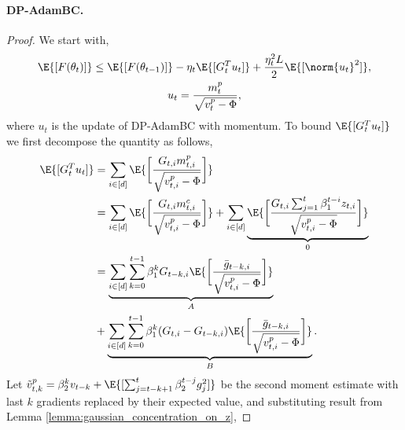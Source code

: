 \documentclass[letterpaper]{article} %
\begin{document}
\paragraph{DP-AdamBC.}
\begin{proof}
    We start with,
    \begin{gather*}
        \E{[F(\theta_t)]} \leq \E{[F(\theta_{t-1})]} - \eta_t \E{[G_t^T u_t]} + \frac{\eta_t^2 L}{2} \E{[\norm{u_t}^2]}, \\
        u_t = \frac{m_t^{p}}{\sqrt{v_t^{p}-\Phi}},
    \end{gather*}
    where $u_t$ is the update of DP-AdamBC with momentum. To bound $\E{[G_t^T u_t]}$ we first decompose the quantity as follows,
    \begin{align*}
        \E{[G_t^T u_t]} &= \sum_{i\in[d]} \E{\bigg[ \frac{G_{t,i}m_{t,i}^p}{\sqrt{v_{t,i}^p - \Phi}} \bigg]} \\&= \sum_{i\in [d] } \E{\bigg[ \frac{G_{t,i}m_{t,i}^c}{\sqrt{v_{t,i}^p - \Phi}} \bigg]} + \sum_{i\in[d]} \underbrace{\E{\bigg[ \frac{G_{t,i}\sum_{j=1}^{t}\beta_1^{t-i}z_{t,i}}{\sqrt{v_{t,i}^p - \Phi}} \bigg]}}_{0} \\
        &= \underbrace{\sum_{i\in [d] } \sum_{k=0}^{t-1} \beta_1^{k} G_{t-k,i} \E{\bigg[ \frac{\bar{g}_{t-k,i}}{\sqrt{v_{t,i}^p - \Phi}} \bigg]}}_{A} \\&+ \underbrace{\sum_{i\in [d] } \sum_{k=0}^{t-1} \beta_1^{k} (G_{t, i}-G_{t-k,i}) \E{\bigg[ \frac{\bar{g}_{t-k,i}}{\sqrt{v_{t,i}^p - \Phi}} \bigg]}}_{B}.
    \end{align*}
    Let $\Tilde{v}_{t, k}^{p} = \beta_2^{k} v_{t-k} + \E{[\sum_{j=t-k+1}^{t} \beta_2^{t-j} g_{j}^2]}$ be the second moment estimate with last $k$ gradients replaced by their expected value, and substituting result from Lemma \ref{lemma:gaussian_concentration_on_z},

\end{proof}
\end{document}
